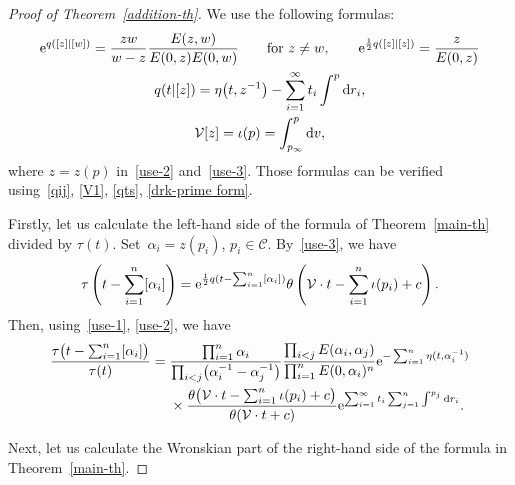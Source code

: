 \documentclass[10pt,a4paper]{amsart}
\numberwithin{equation}{section}
\theoremstyle{definition}
\begin{document}
\begin{proof}[Proof of Theorem~\ref{addition-th}]
We use the following formulas:
\begin{gather}
{\rm e}^{q([z]|[w])}=\frac{zw}{w-z}\frac{E(z,w)}{E(0,z)E(0,w)} \qquad \text{for $z\neq w$},
\qquad
{\rm e}^{\frac{1}{2}q([z]|[z])}=\frac{z}{E(0,z)}
\label{use-1}
\\
q(t|[z])=\eta\bigl(t,z^{-1}\bigr)-\sum_{i=1}^\infty t_i\int^p {\rm d}r_i,
\label{use-2}
\\
{\mathcal V}[z]=\iota(p)=\int_{p_\infty}^p {\rm d}v,
\label{use-3}
\end{gather}
where $z=z(p)$ in~\eqref{use-2} and~\eqref{use-3}.
Those formulas can be verified using~\eqref{qij}, \eqref{V1}, \eqref{qts}, \eqref{drk-prime form}.

Firstly, let us calculate the left-hand side of the formula of Theorem~\ref{main-th} divided by
$\tau(t)$.
Set~${\alpha_i=z(p_i)}$, $p_i\in {\mathcal C}$. By~\eqref{use-3}, we have
\begin{gather*}
\tau\left(t-\sum_{i=1}^n[\alpha_i]\right)
={\rm e}^{\frac{1}{2}q(t-\sum_{i=1}^n[\alpha_i])}\theta\left({\mathcal V}\cdot t-\sum_{i=1}^n\iota(p_i)+c\right).
\end{gather*}
Then, using~\eqref{use-1}, \eqref{use-2}, we have
\begin{align}
\frac{\tau\bigl(t-\sum_{i=1}^n[\alpha_i]\bigr)}{\tau(t)}
={}&
\frac{\prod_{i=1}^n\alpha_i}{\prod_{i<j}\bigl(\alpha_i^{-1}-\alpha_j^{-1}\bigr)}
\frac{\prod_{i<j}E(\alpha_i,\alpha_j)}{\prod_{i=1}^nE(0,\alpha_i)^n}
{\rm e}^{-\sum_{i=1}^n\eta(t,\alpha_i^{-1})}
\nonumber
\\
&
\times
\frac{\theta\bigl({\mathcal V}\cdot t-\sum_{i=1}^n \iota(p_i)+c\bigr)}{\theta({\mathcal V}\cdot t+c)}
{\rm e}^{\sum_{i=1}^\infty t_i\sum_{j=1}^n \int^{p_j} {\rm d}r_i}.
\label{LHS}
\end{align}

Next, let us calculate the Wronskian part of the right-hand side of the formula
in Theorem~\ref{main-th}.


\end{proof}
\end{document}
